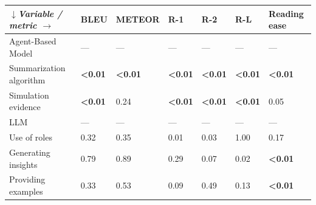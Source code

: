 \begin{tabular}{|l|l|l|l|l|l|l|}
\hline
\textit{$\downarrow$Variable / metric $\rightarrow$} & BLEU & METEOR & R-1 & R-2 & R-L & Reading ease \\
 \hline
 Agent-Based Model & — & — & — & — & — & — \\
 \hline
 Summarization algorithm & \textbf{\textless{}0.01} & \textbf{\textless{}0.01} & \textbf{\textless{}0.01} & \textbf{\textless{}0.01} & \textbf{\textless{}0.01} & \textbf{\textless{}0.01} \\
 \hline
 Simulation evidence & \textbf{\textless{}0.01} & 0.24 & \textbf{\textless{}0.01} & \textbf{\textless{}0.01} & \textbf{\textless{}0.01} & 0.05 \\
 \hline
 LLM & — & — & — & — & — & — \\
 \hline
 Use of roles & 0.32 & 0.35 & 0.01 & 0.03 & 1.00 & 0.17 \\
 \hline
 Generating insights & 0.79 & 0.89 & 0.29 & 0.07 & 0.02 & \textbf{\textless{}0.01} \\
 \hline
 Providing examples & 0.33 & 0.53 & 0.09 & 0.49 & 0.13 & \textbf{\textless{}0.01} \\
\hline
\end{tabular}
